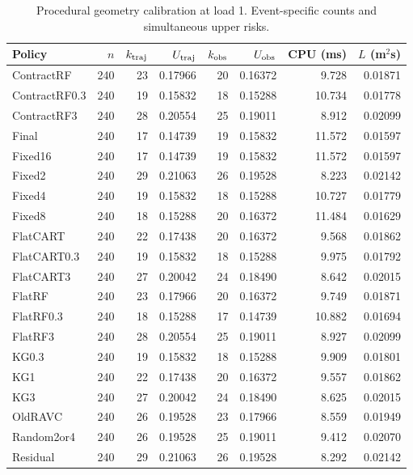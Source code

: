 \begin{table}[!htbp]\centering\footnotesize
\caption{Procedural geometry calibration at load 1. Event-specific counts and simultaneous upper risks.}\label{supp:calgeometry_calibration1}
\begin{tabular}{@{}lrrrrrrr@{}}\toprule
Policy & $n$ & $k_{\rm traj}$ & $U_{\rm traj}$ & $k_{\rm obs}$ & $U_{\rm obs}$ & CPU (ms) & $L$ (m$^2$s)\\\midrule
ContractRF & 240 & 23 & 0.17966 & 20 & 0.16372 & 9.728 & 0.01871\\
ContractRF0.3 & 240 & 19 & 0.15832 & 18 & 0.15288 & 10.734 & 0.01778\\
ContractRF3 & 240 & 28 & 0.20554 & 25 & 0.19011 & 8.912 & 0.02099\\
Final & 240 & 17 & 0.14739 & 19 & 0.15832 & 11.572 & 0.01597\\
Fixed16 & 240 & 17 & 0.14739 & 19 & 0.15832 & 11.572 & 0.01597\\
Fixed2 & 240 & 29 & 0.21063 & 26 & 0.19528 & 8.223 & 0.02142\\
Fixed4 & 240 & 19 & 0.15832 & 18 & 0.15288 & 10.727 & 0.01779\\
Fixed8 & 240 & 18 & 0.15288 & 20 & 0.16372 & 11.484 & 0.01629\\
FlatCART & 240 & 22 & 0.17438 & 20 & 0.16372 & 9.568 & 0.01862\\
FlatCART0.3 & 240 & 19 & 0.15832 & 18 & 0.15288 & 9.975 & 0.01792\\
FlatCART3 & 240 & 27 & 0.20042 & 24 & 0.18490 & 8.642 & 0.02015\\
FlatRF & 240 & 23 & 0.17966 & 20 & 0.16372 & 9.749 & 0.01871\\
FlatRF0.3 & 240 & 18 & 0.15288 & 17 & 0.14739 & 10.882 & 0.01694\\
FlatRF3 & 240 & 28 & 0.20554 & 25 & 0.19011 & 8.927 & 0.02099\\
KG0.3 & 240 & 19 & 0.15832 & 18 & 0.15288 & 9.909 & 0.01801\\
KG1 & 240 & 22 & 0.17438 & 20 & 0.16372 & 9.557 & 0.01862\\
KG3 & 240 & 27 & 0.20042 & 24 & 0.18490 & 8.625 & 0.02015\\
OldRAVC & 240 & 26 & 0.19528 & 23 & 0.17966 & 8.559 & 0.01949\\
Random2or4 & 240 & 26 & 0.19528 & 25 & 0.19011 & 9.412 & 0.02070\\
Residual & 240 & 29 & 0.21063 & 26 & 0.19528 & 8.292 & 0.02142\\
\bottomrule\end{tabular}\end{table}


